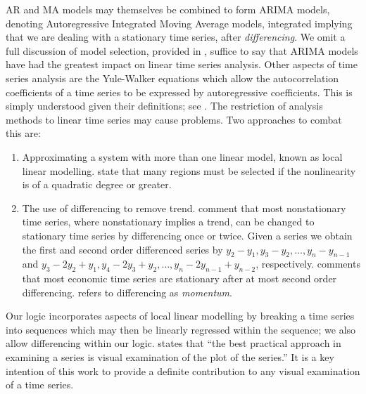 AR and MA models may themselves be combined to form ARIMA models,
denoting Autoregressive Integrated Moving Average models, integrated
implying that we are dealing with a stationary time series, after {\em
differencing}.
We omit a full discussion of model selection,
provided in
\cite{ko90,end95}, suffice to say that ARIMA models have had the
greatest impact on linear time series analysis. Other aspects of time
series analysis are the Yule-Walker equations which allow the
autocorrelation coefficients of a time series to be expressed by
autoregressive coefficients. This is simply understood given their
definitions; see \cite{ko90}. The restriction of analysis methods to
linear time series may cause problems. Two approaches to combat this
are:
\begin{enumerate}
\item Approximating a system with more than one linear model, known as
local linear modelling. \cite{wg94} state that many regions must be
selected if the nonlinearity is of a quadratic degree or greater.
\item The use of differencing to remove trend. \cite{naze88,end95}
comment that most nonstationary time series, where nonstationary
implies a trend, can be changed to
stationary time series by differencing once or twice. Given a series
 we obtain the first and second order differenced series by 
$y_2 - y_1, y_3 - y_2, \ldots, y_n - y_{n-1}$ and 
$y_3 - 2y_2 + y_1, y_4 - 2y_3 + y_2, \ldots, y_n - 2y_{n-1} +
y_{n-2}$, respectively. \cite{naze88} comments that most economic time
series are stationary after at most second order
differencing. \cite{raf99} refers to differencing as {\em momentum}.
\end{enumerate}

Our logic incorporates aspects of local linear modelling by breaking a
time series into sequences which may then be linearly regressed within
the sequence; we also allow differencing within our
logic. \cite{naze88} states that ``the best practical approach in
examining a series is visual examination of the plot of the series.''
It is a key intention of this work to provide a definite contribution
to any visual examination of a time series.  

\medskip


